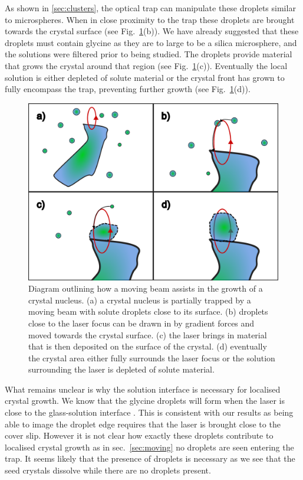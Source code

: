 As shown in \ref{sec:clusters}, the optical trap can manipulate 
these droplets similar to microspheres. When in close proximity 
to the trap these droplets are brought towards the crystal 
surface (see Fig.~\ref{fig:local_nucleation}(b)). We have 
already suggested that these droplets must contain glycine as 
they are to large to be a silica microsphere, and the solutions 
were filtered prior to being studied. The droplets provide 
material that grows the crystal around that region (see Fig.~\ref{fig:local_nucleation}(c)). Eventually the local 
solution is either depleted of solute material or the crystal 
front has grown to fully encompass the trap, preventing further 
growth (see Fig.~\ref{fig:local_nucleation}(d)). 
\begin{figure}[h!]
	\centering
	\includegraphics[width=0.8\linewidth]{galvano_diagram.pdf}
	\caption{Diagram outlining how a moving beam assists in the 
		growth of a crystal nucleus. (a) a crystal nucleus is 
		partially trapped by a moving beam with solute droplets 
		close to its surface. (b) droplets close to the laser
		focus can be drawn in by gradient forces and moved 
		towards the crystal surface. (c) the laser brings in 
		material that is then deposited on the surface of the 
		crystal. (d) eventually the crystal area either fully 
		surrounds the laser focus or the solution surrounding 
		the laser is depleted of solute material.}
	\label{fig:local_nucleation}
\end{figure}

What remains unclear is why the solution interface is necessary
for localised crystal growth. We know that the glycine droplets 
will form when the laser is close to the glass-solution interface
\cite{Gowayed2021, Yuyama2010, Yuyama2012}. This is consistent 
with our results as being able to image the droplet edge requires 
that the laser is brought close to the cover slip. However it is 
not clear how exactly these droplets contribute to localised 
crystal growth as in sec.~\ref{sec:moving} no droplets are seen 
entering the trap. It seems likely that the presence of droplets 
is necessary as we see that the seed crystals dissolve while 
there are no droplets present. 

